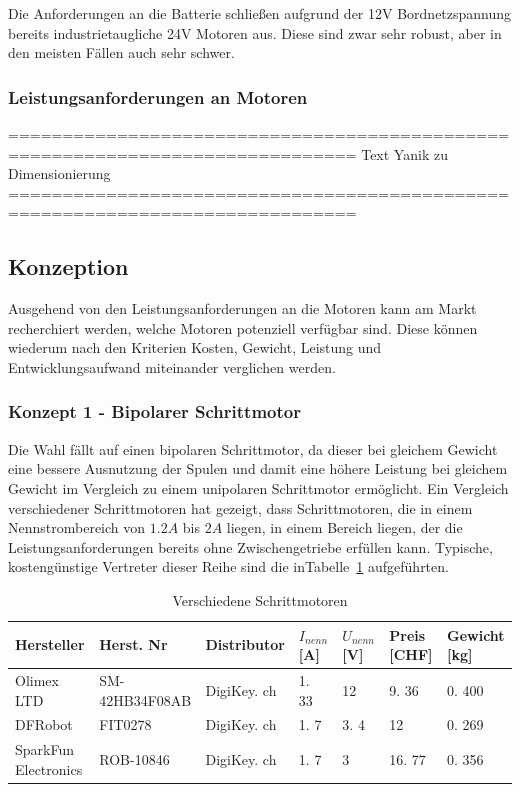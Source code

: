\documentclass[main.  tex]{subfiles} %
\begin{document}
Die Anforderungen an die Batterie schließen aufgrund der 12V Bordnetzspannung
bereits industrietaugliche 24V Motoren aus. Diese sind zwar sehr robust, aber
in den meisten Fällen auch sehr schwer.

\subsubsection*{Leistungsanforderungen an Motoren}

==============================================================================
Text Yanik zu Dimensionierung
==============================================================================

\subsection*{Konzeption}

Ausgehend von den Leistungsanforderungen an die Motoren kann am Markt
recherchiert werden, welche Motoren potenziell verfügbar sind. Diese können
wiederum nach den Kriterien Kosten, Gewicht, Leistung und Entwicklungsaufwand
miteinander verglichen werden.

\subsubsection*{Konzept 1 - Bipolarer Schrittmotor} %

Die Wahl fällt auf einen bipolaren Schrittmotor, da dieser bei gleichem Gewicht
eine bessere Ausnutzung der Spulen und damit eine höhere Leistung bei gleichem
Gewicht im Vergleich zu einem unipolaren Schrittmotor ermöglicht. Ein Vergleich
verschiedener Schrittmotoren hat gezeigt, dass Schrittmotoren, die in einem
Nennstrombereich von $1. 2A$ bis $2A$ liegen, in einem Bereich liegen, der die
Leistungsanforderungen bereits ohne Zwischengetriebe erfüllen kann. Typische,
kostengünstige Vertreter dieser Reihe sind die
inTabelle~\ref{tab:Schrittmotoren_different} aufgeführten.

\begin{table}[h]
    \centering
    \begin{tabular}{|p{2cm}|p{3cm}|p{2cm}|p{1cm}|p{1cm}|p{1cm}|p{}|}
        \hline
        Hersteller           & Herst.  Nr     & Distributor  & $I_{nenn} $ [A] & $U_{nenn}$ [V] & Preis [CHF] & Gewicht [kg] \\ \hline
        Olimex LTD           & SM-42HB34F08AB & DigiKey.  ch & 1.  33          & 12             & 9.  36      & 0.  400      \\ \hline
        DFRobot              & FIT0278        & DigiKey.  ch & 1.  7           & 3.  4          & 12          & 0.  269      \\ \hline
        SparkFun Electronics & ROB-10846      & DigiKey.  ch & 1.  7           & 3              & 16.  77     & 0.  356      \\ \hline
    \end{tabular}
    \caption{Verschiedene Schrittmotoren}
    \label{tab:Schrittmotoren_different}
\end{table}
\end{document}
